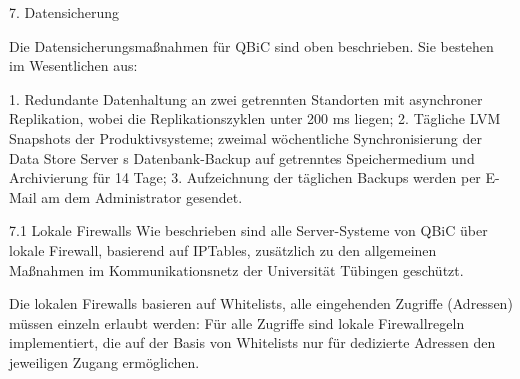 \documentclass[]{scrreprt}
\begin{document}
7. Datensicherung 

Die Datensicherungsmaßnahmen für QBiC sind oben beschrieben. Sie bestehen im Wesentlichen aus:

1. Redundante Datenhaltung an zwei getrennten Standorten mit asynchroner Replikation, wobei die Replikationszyklen unter 200 ms liegen;
2. Tägliche LVM Snapshots der Produktivsysteme; zweimal wöchentliche Synchronisierung der Data Store Server s Datenbank-Backup auf getrenntes Speichermedium und Archivierung für 14 Tage;
3. Aufzeichnung der täglichen Backups werden per E-Mail am dem Administrator gesendet.

7.1 Lokale Firewalls
Wie beschrieben sind alle Server-Systeme von QBiC über lokale Firewall, basierend auf IPTables, zusätzlich zu den allgemeinen Maßnahmen im Kommunikationsnetz der Universität Tübingen geschützt.

Die lokalen Firewalls basieren auf Whitelists, alle eingehenden Zugriffe (Adressen) müssen einzeln erlaubt werden: Für alle Zugriffe sind lokale Firewallregeln implementiert, die auf der Basis von Whitelists nur für dedizierte Adressen den jeweiligen Zugang ermöglichen. 
\end{document}
